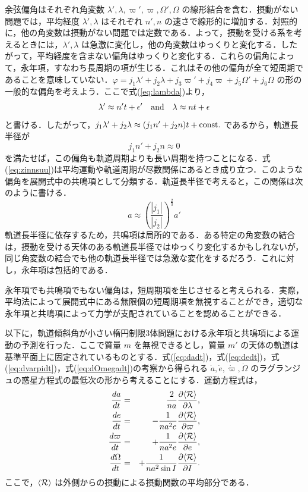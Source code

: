 \documentclass[11pt,a4paper,oneside,onecolumn]{jreport}
\begin{document}
余弦偏角はそれぞれ角変数 $\lambda', \lambda, \varpi', \varpi, \Omega', \Omega$ の線形結合を含む．摂動がない問題では，平均経度 $\lambda', \lambda$ はそれぞれ $n', n$ の速さで線形的に増加する．対照的に，他の角変数は摂動がない問題では定数である．よって，摂動を受ける系を考えるときには，$\lambda', \lambda$ は急激に変化し，他の角変数はゆっくりと変化する．したがって，平均経度を含まない偏角はゆっくりと変化する．これらの偏角によって，永年項，すなわち長周期の項が生じる．これはその他の偏角が全て短周期であることを意味していない．$\varphi = j_1 \lambda' + j_2 \lambda + j_3 \varpi' + j_4 \varpi + j_5 \Omega' + j_6 \Omega$ の形の一般的な偏角を考えよう．ここで式(\ref{eq:lambda})より，
\begin{equation}
\lambda' \approx n' t + \epsilon' \quad {\rm and} \quad \lambda \approx n t + \epsilon
\end{equation}
と書ける．したがって，$j_1 \lambda' + j_2 \lambda \approx (j_1 n' + j_2 n) t + {\rm const.}$ であるから，軌道長半径が
\begin{equation}
j_1 n' + j_2 n \approx 0 \label{eq:zinnsuu}
\end{equation}
を満たせば，この偏角も軌道周期よりも長い周期を持つことになる．式(\ref{eq:zinnsuu})は平均運動や軌道周期が尽数関係にあるとき成り立つ．このような偏角を展開式中の共鳴項として分類する．軌道長半径で考えると，この関係は次のように書ける．
\begin{equation}
a \approx \left( \frac{|j_1|}{|j_2|} \right)^{\frac{2}{3}} a'
\end{equation}
軌道長半径に依存するため，共鳴項は局所的である．ある特定の角変数の結合は，摂動を受ける天体のある軌道長半径ではゆっくり変化するかもしれないが，同じ角変数の結合でも他の軌道長半径では急激な変化をするだろう．これに対し，永年項は包括的である．

永年項でも共鳴項でもない偏角は，短周期項を生じさせると考えられる．実際，平均法によって展開式中にある無限個の短周期項を無視することができ，適切な永年項と共鳴項によって力学が支配されていることを認めることができる．

以下に，軌道傾斜角が小さい楕円制限3体問題における永年項と共鳴項による運動の予測を行った．ここで質量 $m$ を無視できるとし，質量 $m'$ の天体の軌道は基準平面上に固定されているものとする．式(\ref{eq:dadt})，式(\ref{eq:dedt})，式(\ref{eq:dvarpidt})，式(\ref{eq:dOmegadt})の考察から得られる $\dot{a}, \dot{e}, \dot{\varpi}, \dot{\Omega}$ のラグランジュの惑星方程式の最低次の形から考えることにする．運動方程式は，
\begin{eqnarray}
\frac{d a}{d t} & = & \frac{2}{n a} \frac{\partial \langle {\cal R} \rangle}{\partial \lambda}, \label{eq:dadt2} \\
\frac{d e}{d t} & = & - \frac{1}{n a^2 e} \frac{\partial \langle {\cal R} \rangle}{\partial \varpi}, \label{eq:dedt2} \\
\frac{d \varpi}{d t} & = & + \frac{1}{n a^2 e} \frac{\partial \langle {\cal R} \rangle}{\partial e}, \label{eq:dvarpidt2} \\
\frac{d \Omega}{d t} & = & + \frac{1}{n a^2 \sin I} \frac{\partial \langle {\cal R} \rangle}{\partial I}.\label{eq:dOmegadt2}
\end{eqnarray}
ここで，$\langle {\cal R} \rangle$ は外側からの摂動による摂動関数の平均部分である．
\end{document}
